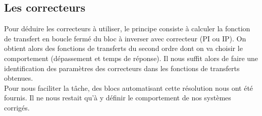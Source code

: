 \subsection{Les correcteurs}
Pour déduire les correcteurs à utiliser, le principe consiste à calculer la fonction de transfert en boucle fermé du bloc à inverser avec correcteur (PI ou IP). On obtient alors des fonctions de transferts du second ordre dont on va choisir le comportement (dépassement et temps de réponse). Il nous suffit alors de faire une identification des paramètres des correcteurs dans les fonctions de transferts obtenues.\\
Pour nous faciliter la tâche, des blocs automatisant cette résolution nous ont été fournis. Il ne nous restait qu'à y définir le comportement de nos systèmes corrigés.\\